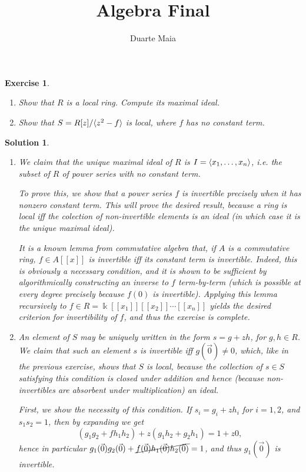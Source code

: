 \documentclass{article}
\title{Algebra Final}
\author{Duarte Maia}
\newtheorem{ex}{Exercise}
\theoremstyle{nonumberplain}
\newtheorem{sol}{Solution}
\newcommand{\kk}{\Bbbk}
\DeclarePairedDelimiter{\braket}{\langle}{\rangle}
\begin{document}
\maketitle

\begin{ex}
\leavevmode
\begin{enumerate}
\item Show that $R$ is a local ring. Compute its maximal ideal.
\item Show that $S = R[z]/\braket{z^2 - f}$ is local, where $f$ has no constant term.
\end{enumerate}
\end{ex}

\begin{sol}
\leavevmode
\begin{enumerate}
\item We claim that the unique maximal ideal of $R$ is $I = \braket{x_1, \dots, x_n}$, i.e. the subset of $R$ of power series with no constant term.

To prove this, we show that a power series $f$ is invertible precisely when it has nonzero constant term. This will prove the desired result, because a ring is local iff the colection of non-invertible elements is an ideal (in which case it is the unique maximal ideal).

It is a known lemma from commutative algebra that, if $A$ is a commutative ring, $f \in A[[x]]$ is invertible iff its constant term is invertible. Indeed, this is obviously a necessary condition, and it is shown to be sufficient by algorithmically constructing an inverse to $f$ term-by-term (which is possible at every degree precisely because $f(0)$ is invertible). Applying this lemma recursively to $f \in R = \kk[[x_1]][[x_2]]\cdots[[x_n]]$ yields the desired criterion for invertibility of $f$, and thus the exercise is complete.

\item An element of $S$ may be uniquely written in the form $s = g + z h$, for $g,h \in R$. We claim that such an element $s$ is invertible iff $g(\vec 0) \neq 0$, which, like in the previous exercise, shows that $S$ is local, because the collection of $s \in S$ satisfying this condition is closed under addition and hence (because non-invertibles are absorbent under multiplication) an ideal.

First, we show the necessity of this condition. If $s_i = g_i + z h_i$ for $i = 1,2$, and $s_1 s_2 = 1$, then by expanding we get
\begin{equation}\label{eq:inv}
(g_1 g_2 + f h_1 h_2) + z (g_1 h_2 + g_2 h_1) = 1 + z 0,
\end{equation}
hence in particular $g_1(\vec 0) g_2(\vec 0) + \cancel{f(\vec 0) h_1(\vec 0) h_2(\vec 0)} = 1$, and thus $g_1(\vec 0)$ is invertible.


\end{enumerate}
\end{sol}
\end{document}
